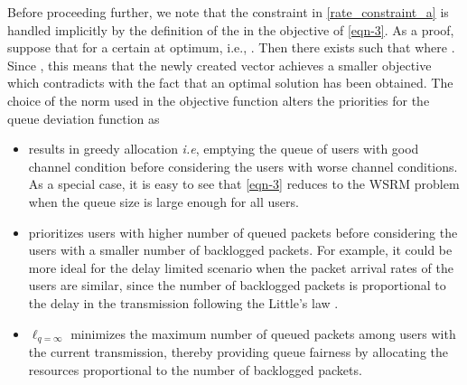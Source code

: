 Before proceeding further, we note that the constraint in \eqref{rate_constraint_a} is handled implicitly by the definition of the  in the objective of \eqref{eqn-3}. As a proof, suppose that  for a certain  at optimum, i.e., . Then there exists  such that  where . Since , this means that the newly created vector  achieves a smaller objective which contradicts with the fact that an optimal solution has been obtained. The choice of the norm  used in the objective function \cite{berry2004cross,qps_cioffi} alters the priorities for the queue deviation function as
\begin{itemize}
\item {} results in greedy allocation \textit{i.e}, emptying the queue of users with good channel condition before considering the users with worse channel conditions. As a special case, it is easy to see that \eqref{eqn-3} reduces to the \ac{WSRM} problem when the queue size is large enough for all users.
\item {} prioritizes users with higher number of queued packets before considering the users with a smaller number of backlogged packets. For example, it could be more ideal for the delay limited scenario when the packet arrival rates of the users are similar, since the number of backlogged packets is proportional to the delay in the transmission following the Little's law \cite{neely2010stochastic}.
\item \(\ell_{q = \infty} \) minimizes the maximum number of queued packets among users with the current transmission, thereby providing queue fairness by allocating the resources proportional to the number of backlogged packets.
\end{itemize} 